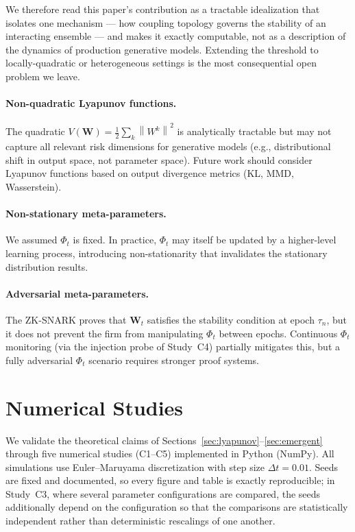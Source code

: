\documentclass[12pt]{article}
\theoremstyle{plain}
\theoremstyle{definition}
\newcommand{\W}{\mathbf{W}}
\newcommand{\norm}[1]{\left\lVert #1 \right\rVert}
\begin{document}
We therefore read this paper's contribution as a tractable idealization that isolates one mechanism
--- how coupling topology governs the stability of an interacting ensemble --- and makes it exactly
computable, not as a description of the dynamics of production generative models. Extending the
threshold to locally-quadratic or heterogeneous settings is the most consequential open problem we
leave.

\paragraph{Non-quadratic Lyapunov functions.}
The quadratic $V(\W) = \tfrac{1}{2}\sum_k \norm{W^k}^2$ is
analytically tractable but may not capture all relevant risk
dimensions for generative models (e.g., distributional shift in
output space, not parameter space).  Future work should consider
Lyapunov functions based on output divergence metrics (KL, MMD,
Wasserstein).

\paragraph{Non-stationary meta-parameters.}
We assumed $\Phi_t$ is fixed.  In practice, $\Phi_t$ may itself be
updated by a higher-level learning process, introducing non-stationarity
that invalidates the stationary distribution results.

\paragraph{Adversarial meta-parameters.}
The ZK-SNARK proves that $\W_t$ satisfies the stability condition at
epoch $\tau_n$, but it does not prevent the firm from manipulating
$\Phi_t$ between epochs.  Continuous $\Phi_t$ monitoring (via the
injection probe of Study~C4) partially mitigates this, but a fully
adversarial $\Phi_t$ scenario requires stronger proof systems.

\section{Numerical Studies}
\label{sec:numerical}

We validate the theoretical claims of Sections~\ref{sec:lyapunov}--\ref{sec:emergent}
through five numerical studies (C1--C5) implemented in Python (NumPy).  All simulations use Euler--Maruyama
discretization with step size $\Delta t = 0.01$.  Seeds are fixed and documented, so every figure
and table is exactly reproducible; in Study~C3, where several parameter configurations are compared,
the seeds additionally depend on the configuration so that the comparisons are statistically
independent rather than deterministic rescalings of one another.
\end{document}
